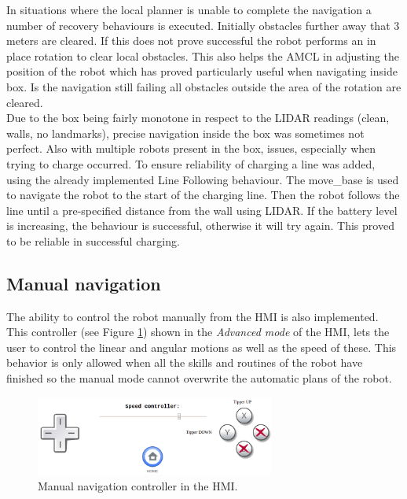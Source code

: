 	In situations where the local planner is unable to complete the navigation a number of recovery behaviours is executed. Initially obstacles further away that 3 meters are cleared. If this does not prove successful the robot performs an in place rotation to clear local obstacles. This also helps the AMCL in adjusting the position of the robot which has proved particularly useful when navigating inside box. Is the navigation still failing all obstacles outside the area of the rotation are cleared. 
    \\
    Due to the box being fairly monotone in respect to the LIDAR readings (clean, walls, no landmarks), precise navigation inside the box was sometimes not perfect. 
    Also with multiple robots present in the box, issues, especially when trying to charge occurred. 
    To ensure reliability of charging a line was added, using the already implemented Line Following behaviour. 
    The move{\_}base is used to navigate the robot to the start of the charging line. 
    Then the robot follows the line until a pre-specified distance from the wall using LIDAR. 
    If the battery level is increasing, the behaviour is successful, otherwise it will try again. This proved to be reliable in successful charging.\\

    \subsection{Manual navigation} %
    \label{sub:mr_manual_navigation}
    The ability to control the robot manually from the HMI is also implemented.
    This controller (see Figure \ref{fig:mr_manual_navigation}) shown in the \emph{Advanced mode} of the HMI, lets the user to control the linear and angular motions as well as the speed of these.
    This behavior is only allowed when all the skills and routines of the robot have finished so the manual mode cannot overwrite the automatic plans of the robot.

    \begin{figure}[H]
        \centering
        \includegraphics[width=0.7\textwidth]{figs/manual_navigation}
        \caption{Manual navigation controller in the HMI.}
        \label{fig:mr_manual_navigation}
    \end{figure}
    

